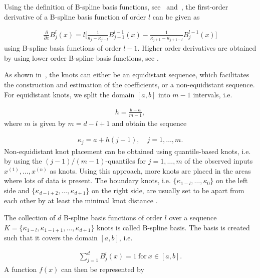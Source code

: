 Using the definition of B-spline basis functions, see~ and~, the first-order derivative of a B-spline basis function of order $l$ can be given as

\begin{align} \label{eq:Bspline-bf-derivative}
	\frac{\partial}{\partial x} B_j^l(x) = l \big[\frac{1}{\kappa_j - \kappa_{j-l}} B_{j-1}^{l-1}(x) - \frac{1}{\kappa_{j+1} - \kappa_{j+1-l}} B_j^{l-1}(x) \big]
\end{align}
%
using B-spline basis functions of order $l-1$. Higher order derivatives are obtained by using lower order B-spline basis functions, see \cite{deBoor1978practicalGuideToSplines}.

As shown in~, the knots can either be an equidistant sequence, which facilitates the construction and estimation of the coefficients, or a non-equidistant sequence. For equidistant knots, we split the domain $[a,b]$ into $m-1$ intervals, i.e.

\begin{align} \label{eq:equidistant-knots-interval}
	h = \frac{b - a} {m - 1},
\end{align}
%
where $m$ is given by $m = d - l + 1$ and obtain the sequence

\begin{align} \label{eq:equidistant-knots-sequence}
	\kappa_j = a + h(j-1), \quad j=1, \dots, m.
\end{align} 
%
Non-equidistant knot placement can be obtained using quantile-based knots, i.e. by using the $(j-1)/(m-1)$-quantiles for $j=1, \dots, m$ of the observed inputs $x^{(1)}, \dots, x^{(n)}$ as knots. Using this approach, more knots are placed in the areas where lots of data is present. The boundary knots, i.e. $\{\kappa_{1-l}, \dots, \kappa_0\}$ on the left side and $\{\kappa_{d-l+2}, \dots, \kappa_{d+1}\}$ on the right side, are usually set to be apart from each other by at least the minimal knot distance \cite{fahrmeir2007regression}. 

The collection of $d$ B-spline basis functions of order $l$ over a sequence $K = \{\kappa_{1-l}, \kappa_{1-l+1}, \dots, \kappa_{d+1}\}$ knots is called B-spline basis. The basis is created such that it covers the domain $[a, b]$, i.e.

\begin{align}
	\sum_{j=1}^d B_j^l(x) = 1 \ \text{for} \ x \in [a,b].
\end{align}
%
A function $f(x)$ can then be represented by 

